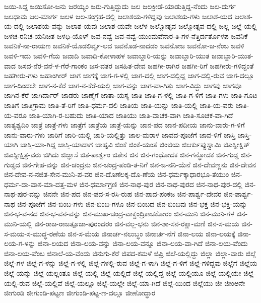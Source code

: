 ಜಯಿ-ಸಿದ್ದ
ಜಯಿಸೋ-ಜನು
ಜರಯ್ಯಂ
ಜರು-ಗುತ್ತಿದ್ದುದು
ಜಲ
ಜಲಕ್ರೀಡೆ-ಯಾಡುತ್ತಿದ್ದ-ನೆಂದು
ಜಲ-ದುರ್ಗ
ಜಲಧಾಮ
ಜಲ-ಮಾರ್ಗ
ಜಲಳ
ಜಲ-ಸಂಗ್ರಹ-ದಲ್ಲಿ
ಜಲಾಶಯ-ಗಳಿದ್ದವು
ಜಲಾಶಯ-ಗಳು
ಜಲಾಶ-ಯದ
ಜಲಾಶ-ಯ-ದಲ್ಲಿ
ಜಲಾಶಯ-ವನ್ನು
ಜಲಾಶ-ಯವು
ಜಲಾಶ-ಯವೇ
ಜಲೆಳ
ಜಲ್ಮೋತ್ಸವ
ಜಲ್ಮೋತ್ಸವ-ದಲ್ಲಿ
ಜಲ್ಲ
ಜಲ್ಲೆ-ಯಲ್ಲಿ
ಜಳಚ-ರನಿಚ-ಯನಿಚಿತ
ಜಳಧಿ-ಯೊಳ್
ಜವ-ನವ್ವೆ
ಜವ-ನವ್ವೆ-ಯುಂಮವೆನಾರ-ತಿ-ಗಳ-ನೆತ್ತಿರ್ದರ್ತೊಳಪ
ಜವನಿಕೆ
ಜವನಿಕೆ-ನಾ-ರಾಯಣ
ಜವನಿಕೆ-ಯೊಡಲಿರ್ವ್ವ-ಲದ
ಜವನೊಡ-ನಾದಡಂ
ಜವನೋಜ
ಜವನೋ-ಜ-ನೆಂಬ
ಜವಳಿ
ಜವಳಿ-ಇದು
ಜವಳಿ-ಗೆಯ
ಜವಾದಿ
ಜವಾದಿ-ಕೋಳಾಹಳ
ಜವಾಬ್ದಾರಿ-ಯನ್ನು
ಜವಾಬ್ದಾರಿ-ಯುತ
ಜವಾಬ್ದಾರಿ-ಯುತ-ವಾದ
ಜಸದ-ನೆರ-ವನೆ-ಳ-ಗೆರೆ-ಗಾಂಕಂ
ಜಸ-ವತರ
ಜಸಹಿತ-ದೇವ
ಜಹಗೀ-ರಾಗಿರ
ಜಹಗೀ-ರಿಗೆ
ಜಹಗೀರು-ಗಳಿದ್ದಂತೆ
ಜಹಗೀರು-ಗಳು
ಜಹಾಂಗೀರ್
ಜಾಗ
ಜಾಗಕ್ಕೆ
ಜಾಗ-ಗ-ಳಲ್ಲಿ
ಜಾಗ-ದಲ್ಲಿ
ಜಾಗ-ದಲ್ಲಿದ್ದ
ಜಾಗ-ದಲ್ಲಿ-ರುವ
ಜಾಗ-ದಲ್ಲೂ
ಜಾಗ-ದಿಂದಲೇ
ಜಾಗ-ನ-ಕೆರೆ
ಜಾಗ-ನ-ಕೆರೆ-ಯಲ್ಲಿ
ಜಾಗ-ವನ್ನು
ಜಾಗ-ವಾ-ಗಿತ್ತು
ಜಾಗ-ವಿದ್ದು
ಜಾಗವು
ಜಾಗವೂ
ಜಾಗಿನ-ಕೆರೆ
ಜಾಗಿರ್ದಾರ್
ಜಾಡರು
ಜಾಣ್ಮೆಗೆ
ಜಾತಾ-ಯಸ್ಯ
ಜಾತಿ
ಜಾತಿ-ಗ-ಳಲ್ಲಿ
ಜಾತಿ-ಗ-ಳಿಗೆ
ಜಾತಿ-ಗಳು
ಜಾತಿ-ಗೂಟ
ಜಾತಿಗೆ
ಜಾತಿಗ್ರಾಮ
ಜಾತಿ-ತೆ-ರಿಗೆ
ಜಾತಿ-ಧರ್ಮ-ದಲಿ
ಜಾತಿಯ
ಜಾತಿ-ಯನ್ನು
ಜಾತಿ-ಯಲ್ಲಿ
ಜಾತಿ-ಯ-ವರು
ಜಾತಿ-ಯ-ವರೂ
ಜಾತಿ-ಯಾಗಿ-ರ-ಬಹುದು
ಜಾತಿ-ಯಾದ
ಜಾತಿಯು
ಜಾತಿ-ವಾಚಕ-ವಾಗಿ
ಜಾತಿ-ಸೂಚಕ-ವಾ-ಗಿದೆ
ಜಾತ್ಯಶ್ವದಿಂ
ಜಾತ್ರೆ
ಜಾತ್ರೆ-ಗಳು
ಜಾತ್ರೆಗೆ
ಜಾತ್ರೆಯ
ಜಾತ್ರೆ-ಯನ್ನು
ಜಾನ-ಪದ
ಜಾನ-ಪದೀಯ
ಜಾನು-ವಾರು-ಗ-ಳಿಗೆ
ಜಾನು-ವಾರು-ಗಳು
ಜಾರಿಗೆ
ಜಾರಿ-ಯಲ್ಲಿ
ಜಾರಿ-ಯಲ್ಲಿತ್ತು
ಜಾಲ-ಮರಾಳ
ಜಾವದ-ಪೂಜೆಗೆ
ಜಾವ-ಳಿಗೆ
ಜಾಸ್ತಿ
ಜಾಸ್ತಿ-ಯಾಗಿ
ಜಾಸ್ತಿ-ಯಾ-ಗಿದ್ದ
ಜಾಸ್ತಿ-ಯಾದಾಗ
ಜಾಹ್ನವಿ
ಜಿಂಕೆ
ಜಿಂಕೆ-ಯಂತೆ
ಜಿಂಜಿಯ
ಜಿಆರ್ಕುಪ್ಪುಸ್ವಾಮಿ
ಜಿಎಸ್ದೀಕ್ಷಿತ್
ಜಿಎಸ್ದೀಕ್ಷಿತ್ರ-ವರು
ಜಿಗಿದು
ಜಿಜ್ಞಾಸೆ
ಜಿತ-ಪಾರ್ಶ್ವಂ
ಜಿತೇನ
ಜಿನ
ಜಿನ-ಗಂಧೋದಕ
ಜಿನ-ಗನ್ಧೋದಕ
ಜಿನ-ಗುಡ್ಡ
ಜಿನ-ಗುಡ್ಡದ
ಜಿನ-ಗೇಹ-ವನ್ನು
ಜಿನ-ಚಂದ್ರನು
ಜಿನ-ಚಂದ್ರ-ಪಂಡಿ-ತ-ನಿಗೆ
ಜಿನ-ಜ-ನನಿ-ಯೆನೆ
ಜಿನ-ದೇವಣ್ಣನು
ಜಿನ-ದೇವನ
ಜಿನ-ದೇವ-ನ-ನಜಿತ-ಸೇನ-ಮುನಿ-ಪ-ವರ
ಜಿನ-ದೊಣೆಲಕ್ಕ-ದೊ-ಣೆಯ
ಜಿನ-ಧರ್ಮಕ್ಕಾಧಾರಭೂ-ತೆಯುಂ
ಜಿನ-ಧರ್ಮ-ದಾ-ವಾಸ-ಮಾ-ದತ್ತ-ಮಳ
ಜಿನ-ಧರ್ಮಾಗ್ರಣಿ
ಜಿನ-ನಾಥ-ಪುರ
ಜಿನ-ನಾಥ-ಪುರದ
ಜಿನ-ನಾಥ-ಪುರ-ದಲ್ಲಿ
ಜಿನ-ನಾಥ-ಪುರ-ವನ್ನು
ಜಿನನೇ
ಜಿನ-ಪದ
ಜಿನ-ಪದ-ಸ-ರಸಿ-ರುಹ
ಜಿನ-ಪಾದ-ಪಂಕಜ
ಜಿನ-ಪಾರ್ಶ್ವ-ದೇವರ
ಜಿನ-ಪಾರ್ಶ್ವ-ನಾಥ
ಜಿನ-ಪೂಜೆಗೆ
ಜಿನ-ಬಿಂಬ-ಗಳು
ಜಿನ-ಬಿಂಬ-ಗಳೂ
ಜಿನ-ಬಿಂಬದ
ಜಿನ-ಬಿಂಬವು
ಜಿನ-ಭಕ್ತ
ಜಿನ-ಭಕ್ತಿ-ಯನ್ನು
ಜಿನ-ಭ-ವ-ನದ
ಜಿನ-ಭ-ವನ-ವನ್ನು
ಜಿನ-ಮುಖ-ಚಂದ್ರ-ವಾಕ್ಚಂದ್ರಿಕಾಚಕೋರಂ
ಜಿನ-ಮುನಿ
ಜಿನ-ಮುನಿ-ಗಳ
ಜಿನ-ಮುನಿ-ಯಲ್ಲಿ
ಜಿನ-ರಾಜ-ರಾಜತ್ಪೂಜಾ-ಪುರಂದರಂ
ಜಿನ-ವಲ್ಲ-ಭನು
ಜಿನ-ಶಾ-ಸನ-ರಕ್ಷಾ-ಮಣಿ
ಜಿನ-ಸ-ಮಯ
ಜಿನ-ಸ-ಮಯ-ಸ-ಮುದ್ಧ-ರಣೆಯ
ಜಿನ-ಸ-ಮೆಯ
ಜಿನಾರ್ಚ-ನಲುಬ್ಧಂ
ಜಿನಾರ್ಚ-ನೆಗೆ
ಜಿನಾ-ಲಯ
ಜಿನಾ-ಲಯಕ್ಕೆ
ಜಿನಾ-ಲಯ-ಗ-ಳನ್ನು
ಜಿನಾ-ಲಯದ
ಜಿನಾ-ಲಯ-ವನ್ನು
ಜಿನಾ-ಲಯ-ವನ್ನೂ
ಜಿನಾ-ಲಯ-ವಾ-ಗಿದೆ
ಜಿನಾ-ಲಯ-ವೆಂದು
ಜಿನಾ-ಲಯ-ವೆಂಬ
ಜಿನಾಲೆ-ಯ-ವೆಂದು
ಜಿನುಗು-ಕೆರೆ
ಜಿಪದ-ಕಮಳೆ
ಜಿಫ್ರಿ
ಜಿಲೆ-ಯಲ್ಲಿದ್ದು
ಜಿಲ್ಲಾ
ಜಿಲ್ಲಾ-ವಾರು
ಜಿಲ್ಲೆ
ಜಿಲ್ಲೆ-ಗಳ
ಜಿಲ್ಲೆ-ಗ-ಳನ್ನು
ಜಿಲ್ಲೆ-ಗ-ಳಲ್ಲಿ
ಜಿಲ್ಲೆ-ಗಳಲ್ಲಿ-ರುವ
ಜಿಲ್ಲೆ-ಗ-ಳಾಗಿ
ಜಿಲ್ಲೆ-ಗ-ಳಿಗೆ
ಜಿಲ್ಲೆ-ಗಳಿದ್ದವು
ಜಿಲ್ಲೆಗೆ
ಜಿಲ್ಲೆಯ
ಜಿಲ್ಲೆ-ಯನ್ನು
ಜಿಲ್ಲೆ-ಯಲ್ಲಂತೂ
ಜಿಲ್ಲೆ-ಯಲ್ಲಿ
ಜಿಲ್ಲೆ-ಯಲ್ಲಿದೆ
ಜಿಲ್ಲೆ-ಯಲ್ಲಿದ್ದ
ಜಿಲ್ಲೆ-ಯಲ್ಲಿಯೂ
ಜಿಲ್ಲೆ-ಯಲ್ಲಿಯೇ
ಜಿಲ್ಲೆ-ಯಲ್ಲಿ-ರುವ
ಜಿಲ್ಲೆ-ಯಲ್ಲಿವೆ
ಜಿಲ್ಲೆ-ಯಲ್ಲೂ
ಜಿಲ್ಲೆ-ಯಲ್ಲೇ
ಜಿಲ್ಲೆ-ಯಾ-ಗಿದೆ
ಜಿಲ್ಲೆ-ಯಿಂದ
ಜಿಲ್ಲೆಯು
ಜೀ
ಜೀಂಅನೇ
ಜೀಗುಂಡಿ
ಜೀಗುಂಡಿ-ಪಟ್ಟಣ
ಜೀಗುಂಡಿ-ಪಟ್ಟ-ಣ-ದಲ್ಲೂ
ಜೀಣೋದ್ಧಾರ
